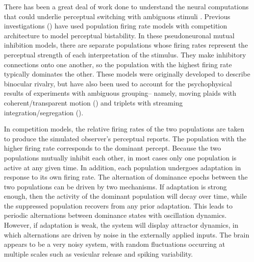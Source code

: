 \documentclass{frontiersSCNS} %
\begin{document}
There has been a great deal of work done to understand the neural computations that could underlie perceptual switching with ambiguous stimuli \cite{}. Previous investigations (\cite{Wilson1972, Wilson2003, Laing2002, Shpiro2009, Pastukhov2013}) have used population firing rate models with competition architecture to model perceptual bistability. In these pseudoneuronal mutual inhibition models, there are separate populations whose firing rates represent the perceptual strength of each interpretation of the stimulus. They make inhibitory connections onto one another, so the population with the highest firing rate typically dominates the other. These models were originally developed to describe binocular rivalry, but have also been used to account for the psychophysical results of experiments with ambiguous grouping-- namely, moving plaids with coherent/transparent motion (\cite{Shpiro2009, Laing2002, Pastukhov2013}) and triplets with streaming integration/segregation (\cite{Mill2013}).

In competition models, the relative firing rates of the two populations are taken to produce the simulated observer's perceptual reports. The population with the higher firing rate corresponds to the dominant percept. Because the two populations mutually inhibit each other, in most cases only one population is active at any given time. In addition, each population undergoes adaptation in response to its own firing rate. The alternation of dominance epochs between the two populations can be driven by two mechanisms. If adaptation is strong enough, then the activity of the dominant population will decay over time, while the suppressed population recovers from any prior adaptation. This leads to periodic alternations between dominance states with oscillation dynamics. However, if adaptation is weak, the system will display attractor dynamics, in which alternations are driven by noise in the externally applied inputs. The brain appears to be a very noisy system, with random fluctuations occurring at multiple scales such as vesicular release and spiking variability.
\end{document}
